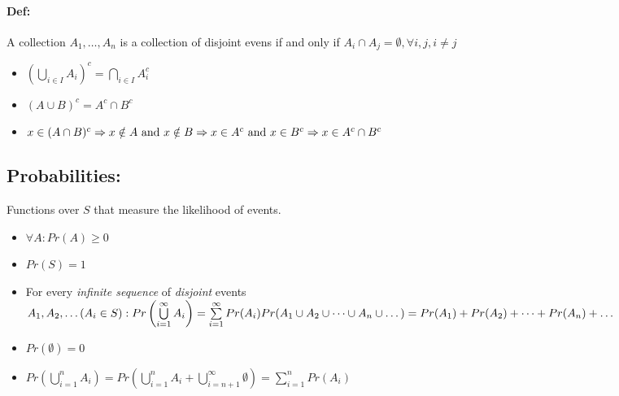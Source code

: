\documentclass{article}
\begin{document}
\begin{multicols}{3}
        \paragraph*{Def:} A collection \(A_1, \dots, A_n\) is a collection of disjoint evens if and only if \(A_i \cap A_j = \emptyset, \forall i, j, i \neq j\)
            \begin{itemize}
                \item[] \(\left (\bigcup\limits_{i\in I} A_i \right)^c = \bigcap\limits_{i\in I}A_i^c \)
                \item[] \((A\cup B)^c = A^c \cap B^c \)
                \item[] \(x\in(A\cap B)^c \\ 
                \Rightarrow x \notin A \text{ and } x\notin B \\
                \Rightarrow x \in A^c \text{ and } x \in B^c \\
                \Rightarrow x \in A^c \cap B^c \)
            \end{itemize}
    \subsection*{Probabilities: } Functions over $S$ that measure the likelihood of events.
            \begin{itemize}
                \item[] $\forall A: Pr(A) \geq 0$
                \item[] $Pr(S) = 1$
                \item[] For every \textit{infinite sequence} of \textit{disjoint} events \( A_1, A_2, \dots (A_i \in S): \\
                Pr\left(\bigcup\limits_{i=1}^{\infty}A_i\right) = \sum\limits_{i=1}^{\infty} Pr(A_i) \\
                Pr(A_1 \cup A_2 \cup \dots \cup A_n \cup \dots) \\
                = Pr(A_1) + Pr(A_2) + \dots + Pr(A_n) + \dots \)
                \item[]\(Pr(\emptyset) = 0\)
                \item[]\(Pr(\bigcup\limits_{i=1}^{n}A_i)=Pr(\bigcup\limits_{i=1}^{n}A_i + \bigcup\limits_{i=n+1}^{\infty}\emptyset) = \sum\limits_{i=1}^{n}Pr(A_i)\)
            \end{itemize}

        \end{multicols}
\end{document}
